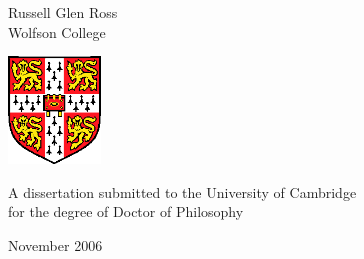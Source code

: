 
\begin{titlepage}
\begin{center}
\vspace*{\fill}

\huge
\thesistitlebig

\vfill
\vfill

\huge
Russell Glen Ross\\[6mm]
\large
Wolfson College

\vfill
\includegraphics[width=70pt]{eps/camshield}
\vfill

\large
A dissertation submitted to the University of Cambridge\\
for the degree of Doctor of Philosophy

\vfill

November 2006

\vspace*{\fill}
\end{center}
\end{titlepage}